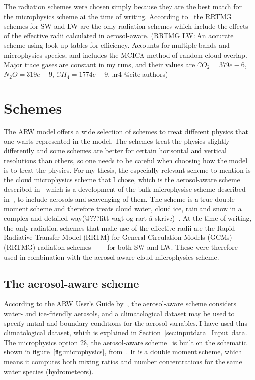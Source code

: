 The radiation schemes were chosen simply because they are the best match for the microphysics scheme at the time of writing. According to~\citet{Thompson2014} the RRTMG schemes for SW and LW are the only radiation schemes which include the effects of the effective radii calculated in aerosol-aware. (RRTMG LW: An accurate scheme using look-up tables for efficiency. Accounts for multiple bands and microphysics species, and includes the MCICA method of random cloud overlap. Major trace gases are constant in my runs, and their values are $CO_2=379e-6$, $N_2O=319e-9$, $CH_4=1774e-9$. nr4 @cite authors)

\section{Schemes}
\label{sec:schemes}
The ARW model offers a wide selection of schemes to treat different physics that one wants represented in the model. The schemes treat the physics slightly differently and some schemes are better for certain horisontal and vertical resolutions than others, so one needs to be careful when choosing how the model is to treat the physics. For my thesis, the especially relevant scheme to mention is the cloud microphysics scheme that I chose, which is the aerosol-aware scheme described in~\citet{Thompson2014} which is a development of the bulk microphysisc scheme described in~\citet{Thompson2008}, to include aerosols and scavenging of them. The scheme is a true double moment scheme and therefore treats cloud water, cloud ice, rain and snow in a complex and detailed way(@???litt vagt og rart å skrive)~\citet{Thompson2014}. At the time of writing, the only radiation schemes that make use of the effective radii are the Rapid Radiative Transfer Model (RRTM) for General Circulation Models (GCMs) (RRTMG) radiation schemes~\citep{Mlawer1997}~\citep{Iacono2000}~\citep{Iacono2003}~\citep{Iacono2008} for both SW and LW. These were therefore used in combination with the aerosol-aware cloud microphysics scheme.

\subsection{The aerosol-aware scheme}
According to the ARW User's Guide by~\citet{Wang2015}, the aerosol-aware scheme considers water- and ice-friendly aerosols, and a climatological dataset may be used to specify initial and boundary conditions for the aerosol variables. I have used this climatological dataset, which is explained in Section~\ref{sec:inputdata}~Input~data.
The microphysics option 28, the aerosol-aware scheme~\citep{Thompson2014} is built on the schematic shown in figure~\ref{fig:microphysics}, from~\citet{Reisner1998}. It is a double moment scheme, which means it computes both mixing ratios and number concentrations for the same water species (hydrometeors). 

